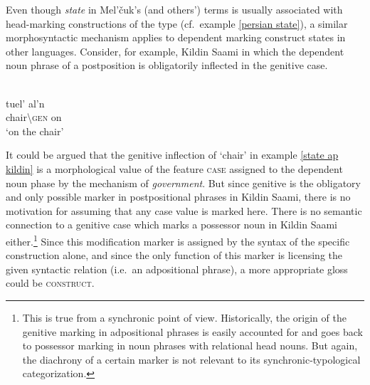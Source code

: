 Even though \emph{state} in Mel'čuk's (and others') terms is usually associated with head-marking constructions of the  type (cf.~example \ref{persian state}), a similar morphosyntactic mechanism applies to dependent marking construct states in other languages. Consider, for example, Kildin Saami in which the dependent noun phrase of a postposition is obligatorily inflected in the genitive case.
\begin{exe}
\ex\label{state ap kildin} 
\\
\gll 	tuel'		al'n\\
	chair\textbackslash\textsc{gen}	on\\
\glt 	‘on the chair’
\end{exe}
It could be argued that the genitive inflection of ‘chair’ in example \ref{state ap kildin} is a morphological value of the feature \textsc{case} assigned to the dependent noun phase by the mechanism of \emph{government}. But since genitive is the obligatory and only possible marker in postpositional phrases in Kildin Saami, there is no motivation for assuming that any case value is marked here. There is no semantic connection to a genitive case which marks a possessor noun in Kildin Saami either.\footnote{This is true from a synchronic point of view. Historically, the origin of the genitive marking in adpositional phrases is easily accounted for and goes back to possessor marking in noun phrases with relational head nouns. But again, the diachrony of a certain marker is not relevant to its synchronic-typological categorization.} Since this modification marker is assigned by the syntax of the specific construction alone, and since the only function of this marker is licensing the given syntactic relation (i.e.~an adpositional phrase), a more appropriate gloss could be \textsc{construct}.

